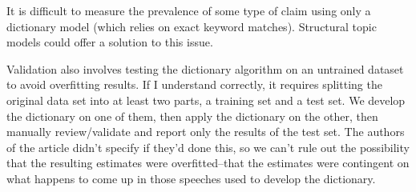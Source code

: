 \documentclass[
  letterpaper,
  DIV=11,
  numbers=noendperiod]{scrartcl}
\begin{document}
It is difficult to measure the prevalence of some type of claim using
only a dictionary model (which relies on exact keyword matches).
Structural topic models could offer a solution to this issue.

Validation also involves testing the dictionary algorithm on an
untrained dataset to avoid overfitting results. If I understand
correctly, it requires splitting the original data set into at least two
parts, a training set and a test set. We develop the dictionary on one
of them, then apply the dictionary on the other, then manually
review/validate and report only the results of the test set. The authors
of the article didn't specify if they'd done this, so we can't rule out
the possibility that the resulting estimates were overfitted--that the
estimates were contingent on what happens to come up in those speeches
used to develop the dictionary.
\end{document}
